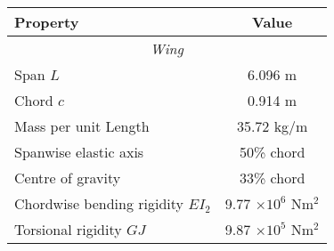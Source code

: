 \documentclass{standalone}
\begin{document}
    \centering
    \begin{tabular}{l c}
    \toprule
    \toprule
    Property&Value\\
    \midrule
    \multicolumn{2}{c}{\textit{Wing}}\\
    Span $L$     & 6.096 m  \\
    Chord $c$   & 0.914 m \\
    Mass per unit Length     & 35.72 kg/m\\
    Spanwise elastic axis   & 50\% chord\\
    Centre of gravity   & 33\% chord\\
    Chordwise bending rigidity $EI_2$   & 9.77 $\times 10^6$ Nm$^2$\\
    Torsional rigidity $GJ$ & 9.87 $\times 10^5$ Nm$^2$\\
    \bottomrule
    \bottomrule
    \end{tabular}
    
\end{document}
